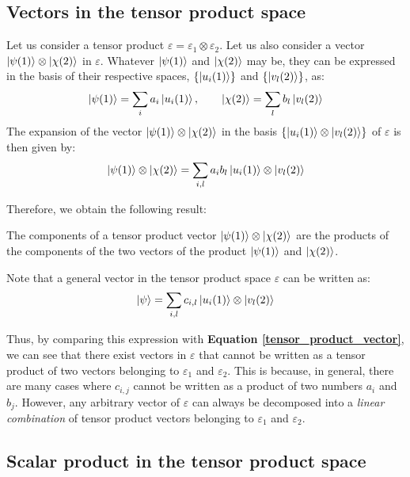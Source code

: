 \subsection{Vectors in the tensor product space}

Let us consider a tensor product $\varepsilon = \varepsilon_1\otimes\varepsilon_2$. Let us also consider a vector $\ket{\psi(1)}\otimes\ket{\chi(2)}$ in $\varepsilon$. Whatever $\ket{\psi(1)}$ and $\ket{\chi(2)}$ may be, they can be expressed in the basis of their respective spaces, $\{\ket{u_i(1)}\}$ and $\{\ket{v_l(2)}\}$, as:
\begin{equation}
    \ket{\psi(1)} = \sum_i a_i\ket{u_i(1)}, \qquad \ket{\chi(2)} = \sum_l b_l\ket{v_l(2)}
\end{equation}
The expansion of the vector $\ket{\psi(1)}\otimes\ket{\chi(2)}$ in the basis $\{\ket{u_i(1)}\otimes \ket{v_l(2)}\}$ of $\varepsilon$ is then given by:
\begin{equation} \label{tensor_product_vector}
    \ket{\psi(1)}\otimes\ket{\chi(2)} = \sum_{i,l} a_ib_l\ket{u_i(1)}\otimes\ket{v_l(2)}
\end{equation}

Therefore, we obtain the following result:
\begin{definition}
    The components of a tensor product vector $\ket{\psi(1)}\otimes\ket{\chi(2)}$ are the products of the components of the two vectors of the product $\ket{\psi(1)}$ and $\ket{\chi(2)}$.
\end{definition}

Note that a general vector in the tensor product space $\varepsilon$ can be written as:
\begin{equation} \label{general_tensor_product_vector}
    \ket{\psi} = \sum_{i,l} c_{i,l}\ket{u_i(1)}\otimes\ket{v_l(2)}
\end{equation}


Thus, by comparing this expression with \textbf{Equation \ref{tensor_product_vector}}, we can see that there exist vectors in $\varepsilon$ that cannot be written as a tensor product of two vectors belonging to $\varepsilon_1$ and $\varepsilon_2$. This is because, in general, there are many cases where $c_{i,j}$ cannot be written as a product of two numbers $a_i$ and $b_j$. However, any arbitrary vector of $\varepsilon$ can always be decomposed into a \textit{linear combination} of tensor product vectors belonging to $\varepsilon_1$ and $\varepsilon_2$.

\subsection{Scalar product in the tensor product space}

